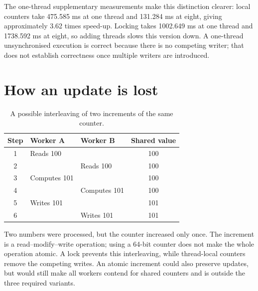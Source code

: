 The one-thread supplementary measurements make this distinction clearer: local counters take 475.585 ms at one thread and 131.284 ms at eight, giving approximately 3.62 times speed-up. Locking takes 1002.649 ms at one thread and 1738.592 ms at eight, so adding threads slows this version down. A one-thread unsynchronised execution is correct because there is no competing writer; that does not establish correctness once multiple writers are introduced.

\section{How an update is lost}
\begin{table}[H]\centering\small
\caption{A possible interleaving of two increments of the same counter.}\label{tab:race}
\begin{tabularx}{\textwidth}{@{}cXXc@{}}\toprule
Step & Worker A & Worker B & Shared value\\\midrule
1 & Reads 100 & & 100\\
2 & & Reads 100 & 100\\
3 & Computes 101 & & 100\\
4 & & Computes 101 & 100\\
5 & Writes 101 & & 101\\
6 & & Writes 101 & 101\\\bottomrule
\end{tabularx}
\end{table}
Two numbers were processed, but the counter increased only once. The increment is a read--modify--write operation; using a 64-bit counter does not make the whole operation atomic. A lock prevents this interleaving, while thread-local counters remove the competing writes. An atomic increment could also preserve updates, but would still make all workers contend for shared counters and is outside the three required variants.
